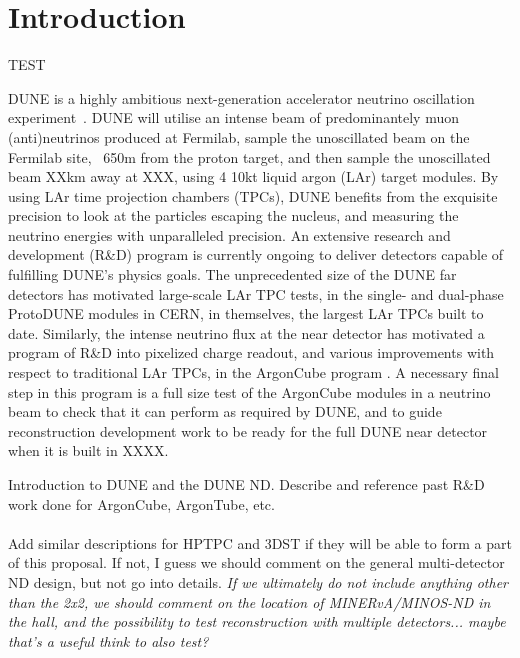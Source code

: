 \section{Introduction}
\label{sec:introduction}

TEST

DUNE is a highly ambitious next-generation accelerator neutrino oscillation experiment~\addcite. DUNE will utilise an intense beam of predominantely muon (anti)neutrinos produced at Fermilab, sample the unoscillated beam on the Fermilab site, ~650m  from the proton target, and then sample the unoscillated beam XXkm away at XXX, using 4 10kt liquid argon (LAr) target modules. By using LAr time projection chambers (TPCs), DUNE benefits from the exquisite precision to look at the particles escaping the nucleus, and measuring the neutrino energies with unparalleled precision.  An extensive research and development (R\&D) program is currently ongoing to deliver detectors capable of fulfilling DUNE's physics goals. The unprecedented size of the DUNE far detectors has motivated large-scale LAr TPC tests, in the single- and dual-phase ProtoDUNE modules in CERN, in themselves, the largest LAr TPCs built to date. Similarly, the intense neutrino flux at the near detector has motivated a program of R\&D into pixelized charge readout, and various improvements with respect to traditional LAr TPCs, in the ArgonCube program . A necessary final step in this program is a full size test of the ArgonCube modules  in a neutrino beam to check that it can perform as required by DUNE, and to guide reconstruction development work to be ready for the full DUNE near detector when it is built in XXXX.

Introduction to DUNE and the DUNE ND. Describe and reference past R\&D work done for ArgonCube, ArgonTube, etc. \\ \\

Add similar descriptions for HPTPC and 3DST if they will be able to form a part of this proposal. If not, I guess we should comment on the general multi-detector ND design, but not go into details. {\it If we ultimately do not include anything other than the 2x2, we should comment on the location of MINERvA/MINOS-ND in the hall, and the possibility to test reconstruction with multiple detectors... maybe that's a useful think to also test?}\\\\

